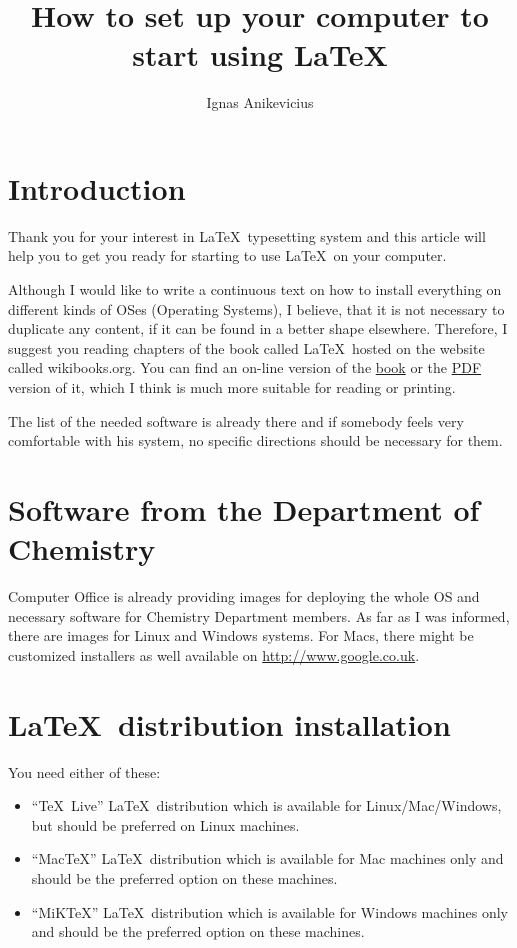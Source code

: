 \documentclass[a4paper]{article}
\title{How to set up your computer to start using \LaTeX{}}
\author{Ignas Anikevicius}
\newcommand{\MiKTeX}{MiK\TeX}
\newcommand{\MacTeX}{Mac\TeX}
\begin{document}
\maketitle

\section{Introduction}

Thank you for your interest in \LaTeX\ typesetting system and this article
will help you to get you ready for starting to use \LaTeX\ on your
computer.

Although I would like to write a continuous text on how to install
everything on different kinds of OSes (Operating Systems), I believe, that it
is not necessary to duplicate any content, if it can be found in a better
shape elsewhere. Therefore, I suggest you reading chapters of the book called
\LaTeX\ hosted on the website called wikibooks.org. You can find an on-line
version of the
\href{https://secure.wikimedia.org/wikibooks/en/wiki/LaTeX}{book} or the
\href{http://upload.wikimedia.org/wikipedia/commons/2/2d/LaTeX.pdf}{PDF}
version of it, which I think is much more suitable for reading or printing.

The list of the needed software is already there and if somebody feels very
comfortable with his system, no specific directions should be necessary for
them.

\section{Software from the Department of Chemistry}

Computer Office is already providing images for deploying the whole OS and
necessary software for Chemistry Department members. As far as I was informed,
there are images for Linux and Windows systems. For Macs, there might be
customized installers as well available on \url{http://www.google.co.uk}.

\section{\LaTeX\ distribution installation}

You need either of these:
\begin{itemize}
    \item ``\TeX\ Live'' \LaTeX\ distribution which is available for
        Linux/Mac/Windows, but should be preferred on Linux machines.
    \item ``\MacTeX'' \LaTeX\ distribution which is available for Mac machines
        only and should be the preferred option on these machines.
    \item ``\MiKTeX'' \LaTeX\ distribution which is available for Windows machines
        only and should be the preferred option on these machines.
\end{itemize}
\end{document}
